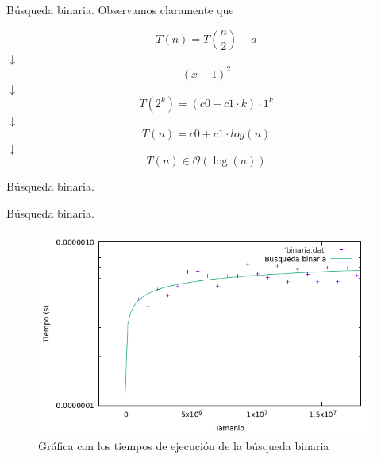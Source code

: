 \documentclass[10pt, xcolor=table]{beamer}
\begin{document}
\begin{frame}[fragile]{Búsqueda binaria. }
Observamos claramente que 

\[
	T(n) = T\left(\frac{n}{2}\right) + a
\]
\centering $\downarrow$ 
\[
	(x-1)^2
\]
\centering $\downarrow$
\[
	T(2^k) = (c0+c1 \cdot k) \cdot 1^k
\]
\centering $\downarrow$
\[
	T(n) = c0 + c1 \cdot log(n)
\]
\centering $\downarrow$
\[
	T(n) \in \mathcal{O}(\log(n))
\]
\end{frame}

\begin{frame}[fragile]{Búsqueda binaria. }
 \begin{table}[h!]
	\centering
	\footnotesize
	\caption{Experiencia empírica de la búsqueda binaria}
\end{table}
\end{frame}


\begin{frame}[fragile]{Búsqueda binaria. }
 \begin{figure}[h!]
	\centering
	\includegraphics[scale=0.45]{./Images/Grafica_binaria.png}
	\caption{Gráfica con los tiempos de ejecución de la búsqueda binaria}
\end{figure}
\end{frame}
\end{document}

